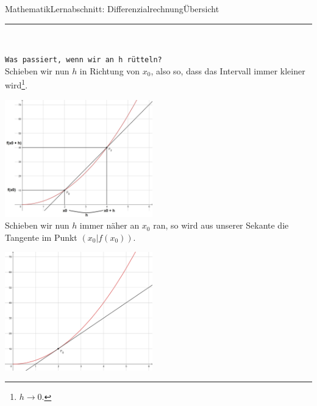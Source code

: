 \documentclass[11pt,twocolumn,oneside,openany,headings=optiontotoc,11pt,numbers=noenddot,final]{article}
\begin{document}
\begin{worksheet}{Mathematik}{Lernabschnitt: Differenzialrechnung}{Übersicht}
		\rule{0.48\textwidth}{0.1pt}\\
		\par\noindent
		\texttt{Was passiert, wenn wir an h rütteln?}\\
		Schieben wir nun \(h\) in Richtung von \(x_0\), also so, dass das Intervall immer kleiner wird\footnote{\(h\rightarrow{}0\).}.\\
		\par\noindent
		\includegraphics[width=0.48\textwidth]{../99_Bilder/04_Skr_DiffQuo_2.jpg}\\
		Schieben wir nun \(h\) immer näher an \(x_0\) ran\footnotemark[1], so wird aus unserer Sekante die Tangente im Punkt \((x_0|f(x_0))\).\\
		\par\noindent
		\includegraphics[width=0.48\textwidth]{../99_Bilder/04_Tang.png}\\

\end{worksheet}
\end{document}
